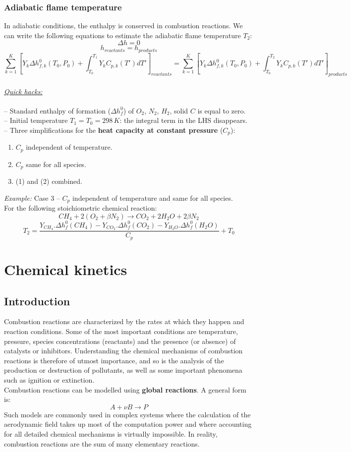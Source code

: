 \documentclass[a4paper,11pt]{article}
\begin{document}
\subsubsection{Adiabatic flame temperature}
In adiabatic conditions, the enthalpy is conserved in combustion reactions. We can write the following equations to estimate the adiabatic flame temperature $T_2$:
\[\Delta h = 0\]
\[h_{reactants} = h_{products}\]
\[\sum^{K}_{k=1}[Y_k\Delta h^0_{f,k}(T_0,P_0)+\int_{T_0}^{T_1}Y_kC_{p,k}(T')dT']_{reactants} = \sum^{K}_{k=1}[Y_k\Delta h^0_{f,k}(T_0,P_0)+\int_{T_0}^{T_2}Y_kC_{p,k}(T')dT']_{products}\]\\
\noindent
\emph{\underline{Quick hacks:}}\\ \\
-- Standard enthalpy of formation ($\Delta h_f^0$) of $O_2$, $N_2$, $H_2$, solid $C$ is equal to zero.\\
-- Initial temperature $T_1=T_0=298\,K$: the integral term in the LHS disappears.
\\
-- Three simplifications for the \textbf{heat capacity at constant pressure} ($C_p$):
\begin{enumerate}
    \item $C_p$ independent of temperature.
    \item $C_p$ same for all species.
    \item (1) and (2) combined.
\end{enumerate}
\emph{Example:} Case 3 -- $C_p$ independent of temperature and same for all species.\\
For the following stoichiometric chemical reaction:
\[CH_4+2(O_2+\beta N_2) \rightarrow CO_2 + 2 H_2O +2\beta N_2\]
\[T_2 = \frac{Y_{CH_4}.\Delta h_f^0(CH_4)
- Y_{CO_2}.\Delta h_f^0(CO_2)
- Y_{H_2O}.\Delta h_f^0(H_2O)}
{C_p}+T_0
\]








\pagebreak
\section{Chemical kinetics}
\subsection{Introduction}
Combustion reactions are characterized by the rates at which they happen and reaction conditions. Some of the most important conditions are temperature, pressure, species concentrations (reactants) and the presence (or absence) of catalysts or inhibitors. Understanding the chemical mechanisms of combustion reactions is therefore of utmost importance, and so is the analysis of the production or destruction of pollutants, as well as some important phenomena such as ignition or extinction.\\
Combustion reactions can be modelled using \textbf{global reactions}. A general form is:
\[A + \nu B \rightarrow P\]
Such models are commonly used in complex systems where the calculation of the aerodynamic field takes up most of the computation power and where accounting for all detailed chemical mechanisms is virtually impossible. In reality, combustion reactions are the sum of many elementary reactions.
\end{document}
